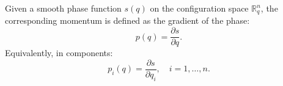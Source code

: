 Given a smooth phase function $s(q)$ on the configuration space $\mathbb{R}^{n}_{q}$, the corresponding momentum is defined as the gradient of the phase:
$$p(q) = \frac{\partial s}{\partial q}.$$
Equivalently, in components:
$$p_{i}(q) = \frac{\partial s}{\partial q_{i}}, \quad i = 1, \dots, n.$$
